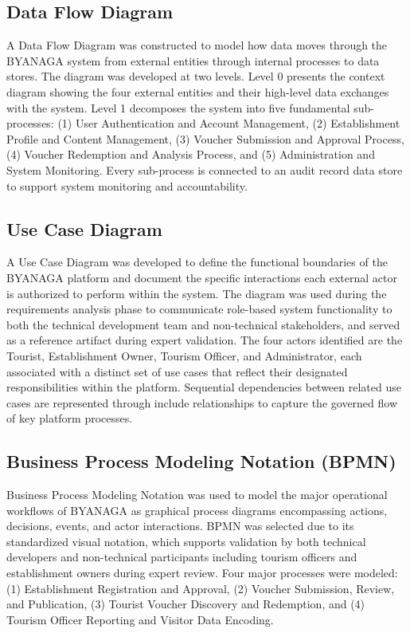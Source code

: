 \documentclass{research}
\begin{document}
    \subsection{Data Flow Diagram}
    A Data Flow Diagram was constructed to model how data moves through the
    BYANAGA system from external entities through internal processes to data
    stores. The diagram was developed at two levels. Level 0 presents the
    context diagram showing the four external entities and their high-level
    data exchanges with the system. Level 1 decomposes the system into five
    fundamental sub-processes: (1) User Authentication and Account Management,
    (2) Establishment Profile and Content Management, (3) Voucher Submission
    and Approval Process, (4) Voucher Redemption and Analysis Process, and
    (5) Administration and System Monitoring. Every sub-process is connected
    to an audit record data store to support system monitoring and
    accountability.

    \subsection{Use Case Diagram}

    A Use Case Diagram was developed to define the functional boundaries of
    the BYANAGA platform and document the specific interactions each external
    actor is authorized to perform within the system. The diagram was used
    during the requirements analysis phase to communicate role-based system
    functionality to both the technical development team and non-technical
    stakeholders, and served as a reference artifact during expert validation.
    The four actors identified are the Tourist, Establishment Owner, Tourism
    Officer, and Administrator, each associated with a distinct set of use
    cases that reflect their designated responsibilities within the platform.
    Sequential dependencies between related use cases are represented through
    include relationships to capture the governed flow of key platform
    processes.

    \subsection{Business Process Modeling Notation (BPMN)}

    Business Process Modeling Notation was used to model the major operational
    workflows of BYANAGA as graphical process diagrams encompassing actions,
    decisions, events, and actor interactions. BPMN was selected due to its
    standardized visual notation, which supports validation by both technical
    developers and non-technical participants including tourism officers and
    establishment owners during expert review. Four major processes were
    modeled: (1) Establishment Registration and Approval, (2) Voucher
    Submission, Review, and Publication, (3) Tourist Voucher Discovery and
    Redemption, and (4) Tourism Officer Reporting and Visitor Data Encoding.
\end{document}

